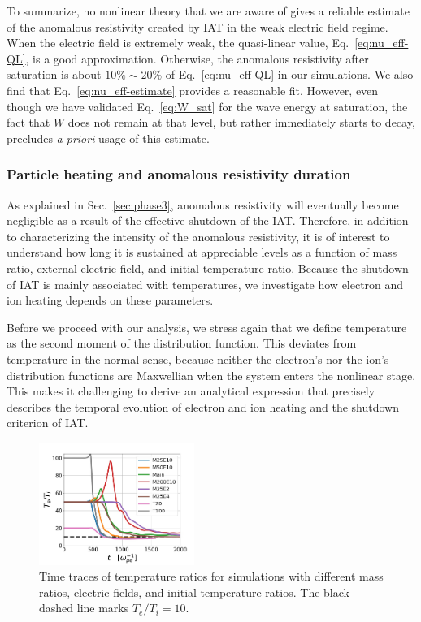 \documentclass[%
 reprint,
 amsmath,
 amssymb,
 aps,
 prx,
floatfix,
superscriptaddress
]{revtex4-2}
\begin{document}
To summarize, no nonlinear theory that we are aware of gives a reliable estimate of the anomalous resistivity created by IAT in the weak electric field regime.
When the electric field is extremely weak, the quasi-linear value, Eq.~\eqref{eq:nu_eff-QL}, is a good approximation. 
Otherwise, the anomalous resistivity after saturation is about $10\%\sim 20\%$ of Eq.~\eqref{eq:nu_eff-QL} in our simulations.
We also find that Eq.~\eqref{eq:nu_eff-estimate} provides a reasonable fit.
However, even though we have validated Eq.~\eqref{eq:W_sat} for the wave energy at saturation, the fact that $W$ does not remain at that level, but rather immediately starts to decay, precludes \textit{a priori} usage of this estimate.


\subsubsection{\label{sec:resistivity_length} Particle heating and anomalous resistivity duration}
As explained in Sec.~\ref{sec:phase3}, anomalous resistivity will eventually become negligible as a result of the effective shutdown of the IAT.
Therefore, in addition to characterizing the intensity of the anomalous resistivity, it is of interest to understand how long it is sustained at appreciable levels as a function of mass ratio, external electric field, and initial temperature ratio.
Because the shutdown of IAT is mainly associated with temperatures, we investigate how electron and ion heating depends on these parameters. 

Before we proceed with our analysis, we stress again that we define temperature as the second moment of the distribution function.
This deviates from temperature in the normal sense, because neither the electron's nor the ion's distribution functions are Maxwellian when the system enters the nonlinear stage.
This makes it challenging to derive an analytical expression that precisely describes the temporal evolution of electron and ion heating and the shutdown criterion of IAT.
\begin{figure}[!htp]
\includegraphics[width=0.45\textwidth]{Fig9.jpeg}%
\caption{\label{fig:9.temp_ratio} Time traces of temperature ratios for simulations with different mass ratios, electric fields, and initial temperature ratios. The black dashed line marks $T_e/T_i = 10$.}
\end{figure}
\end{document}
